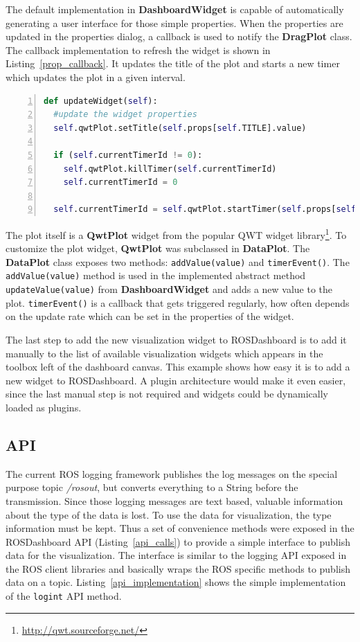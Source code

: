 The default implementation in \textbf{DashboardWidget} is capable of automatically generating a user interface for those simple properties. When the properties are updated in the properties dialog, a callback is used to notify the \textbf{DragPlot} class. The callback implementation to refresh the widget is shown in Listing~\ref{prop_callback}. It updates the title of the plot and starts a new timer which updates the plot in a given interval.

\begin{lstlisting}[frame=single,caption={Implemented callback in DragPlot.},label=prop_callback,language=Python,numbers=left,breaklines=true]
def updateWidget(self):
  #update the widget properties
  self.qwtPlot.setTitle(self.props[self.TITLE].value)

  if (self.currentTimerId != 0):
    self.qwtPlot.killTimer(self.currentTimerId)
    self.currentTimerId = 0

  self.currentTimerId = self.qwtPlot.startTimer(self.props[self.RATE].value)
\end{lstlisting}

The plot itself is a \textbf{QwtPlot} widget from the popular QWT widget library\footnote{\url{http://qwt.sourceforge.net/}}. To customize the plot widget, \textbf{QwtPlot} was subclassed in \textbf{DataPlot}. The \textbf{DataPlot} class exposes two methods: \verb+addValue(value)+ and \verb+timerEvent()+. The \verb+addValue(value)+ method is used in the implemented abstract method \verb+updateValue(value)+ from \textbf{DashboardWidget} and adds a new value to the plot. \verb+timerEvent()+ is a callback that gets triggered regularly, how often depends on the update rate which can be set in the properties of the widget.

The last step to add the new visualization widget to ROSDashboard is to add it manually to the list of available visualization widgets which appears in the toolbox left of the dashboard canvas. This example shows how easy it is to add a new widget to ROSDashboard. A plugin architecture would make it even easier, since the last manual step is not required and widgets could be dynamically loaded as plugins.

\subsection{API}
\label{api_section}
The current ROS logging framework publishes the log messages on the special purpose topic \emph{/rosout}, but converts everything to a String before the transmission. Since those logging messages are text based, valuable information about the type of the data is lost. To use the data for visualization, the type information must be kept. Thus a set of convenience methods were exposed in the ROSDashboard API (Listing~\ref{api_calls}) to provide a simple interface to publish data for the visualization. The interface is similar to the logging API exposed in the ROS client libraries and basically wraps the ROS specific methods to publish data on a topic. Listing~\ref{api_implementation} shows the simple implementation of the \verb+logint+ API method.

